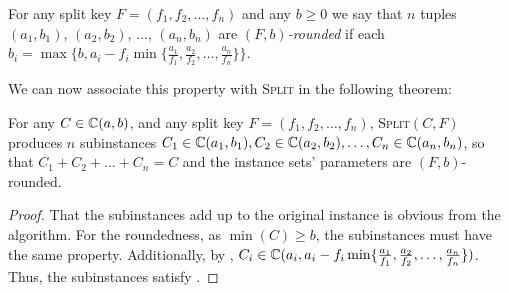 \begin{definition}\label{def:rounded}
    For any split key $F = (f_1, f_2, \dots, f_n)$ and any $b \ge 0$ we say that $n$ tuples $(a_1, b_1)$, $(a_2, b_2)$, $\dots$, $(a_n, b_n)$ are \emph{$(F,b)$-rounded} if each $b_i = \max\{b,a_i - f_i \min\{\frac{a_1}{f_1}, \frac{a_2}{f_2}, \dots, \frac{a_n}{f_n}\}\}$.
\end{definition}

We can now associate this property with \textsc{Split} in the following theorem:

\begin{theorem}\label{th:split-sets}
    For any $C \in \mathbb{C}(a,b)$, and any split key $F = (f_1, f_2, \dots, f_n)$, \textsc{Split}$(C,F)$ produces $n$ subinstances $C_1 \in \mathbb{C}(a_1, b_1), C_2 \in \mathbb{C}(a_2, b_2), \dots, C_n \in \mathbb{C}(a_n, b_n)$, so that $C_1 + C_2 + \dots + C_n = C$ and the instance sets' parameters are $(F,b)$-rounded.
\end{theorem}

\begin{proof}
    That the subinstances add up to the original instance is obvious from the algorithm.
    For the roundedness, as $\min(C) \ge b$, the subinstances must have the same property. Additionally, by , $C_i \in \mathbb{C}(a_i, a_i - f_i \min\{\frac{a_1}{f_1}, \frac{a_2}{f_2}, \dots, \frac{a_n}{f_n}\})$. Thus, the subinstances satisfy .
\end{proof}




